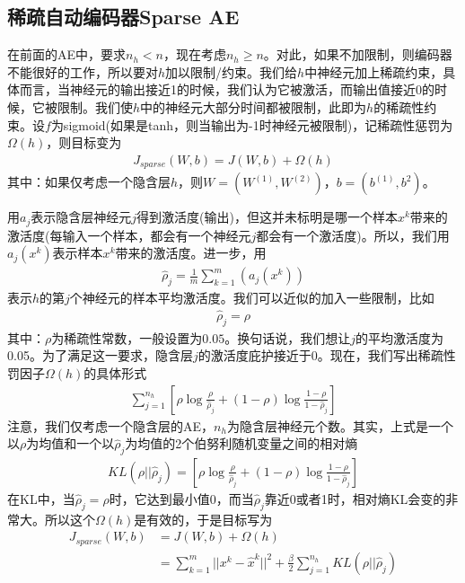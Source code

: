     \subsection{稀疏自动编码器Sparse AE}
        \par
        在前面的AE中，要求$n_h<n$，现在考虑$n_h \geqslant n$。对此，如果不加限制，则编码器不能很好的工作，所以要对$h$加以限制/约束。我们给$h$中神经元加上稀疏约束，具体而言，当神经元的输出接近1的时候，我们认为它被激活，而输出值接近0的时候，它被限制。我们使$h$中的神经元大部分时间都被限制，此即为$h$的稀疏性约束。设$f$为sigmoid(如果是tanh，则当输出为-1时神经元被限制)，记稀疏性惩罚为$\Omega(h)$，则目标变为
        \begin{align*}
        J_{sparse}(W,b) = J(W,b) + \Omega (h)
        \end{align*}
        其中：如果仅考虑一个隐含层$h$，则$W = (W^{(1)},W^{(2)})$，$b= (b^{(1)},b^{2})$。
        \par
        用$a_j$表示隐含层神经元$j$得到激活度(输出)，但这并未标明是哪一个样本$x^k$带来的激活度(每输入一个样本，都会有一个神经元$j$都会有一个激活度)。所以，我们用$a_j(x^k)$表示样本$x^k$带来的激活度。进一步，用
        \begin{align*}
        \hat{\rho}_j = \frac{1}{m} \sum_{k=1}^m \left( a_j(x^k) \right)
        \end{align*}
        表示$h$的第$j$个神经元的样本平均激活度。我们可以近似的加入一些限制，比如
        \begin{align*}
        \hat{\rho}_j = \rho
        \end{align*}
        其中：$\rho$为稀疏性常数，一般设置为$0.05$。换句话说，我们想让$j$的平均激活度为0.05。为了满足这一要求，隐含层$j$的激活度庇护接近于0。现在，我们写出稀疏性罚因子$\Omega(h)$的具体形式
        \begin{align*}
        \sum_{j=1}^{n_h} \left[ \rho\log\frac{\rho}{\hat{\rho}_j}+ (1-\rho)\log\frac{1-\rho}{1-\hat{\rho}_j}  \right]
        \end{align*}
        注意，我们仅考虑一个隐含层的AE，$n_h$为隐含层神经元个数。其实，上式是一个以$\rho$为均值和一个以$\hat{\rho}_j$为均值的2个伯努利随机变量之间的相对熵
        \begin{align*}
        KL(\rho||\hat{\rho}_j) = \left[ \rho\log\frac{\rho}{\hat{\rho}_j}+ (1-\rho)\log\frac{1-\rho}{1-\hat{\rho}_j}  \right]
        \end{align*}
        在KL中，当$\hat{\rho}_j = \rho$时，它达到最小值0，而当$\hat{\rho}_j$靠近0或者1时，相对熵KL会变的非常大。所以这个$\Omega(h)$是有效的，于是目标写为
        \begin{align*}
        J_{sparse}(W,b) &= J(W,b) + \Omega (h)\\
        &= \sum_{k=1}^m ||x^k-\hat{x}^k||^2 + \frac{\beta}{2}\sum_{j=1}^{n_h}KL(\rho||\hat{\rho}_j)
        \end{align*}
